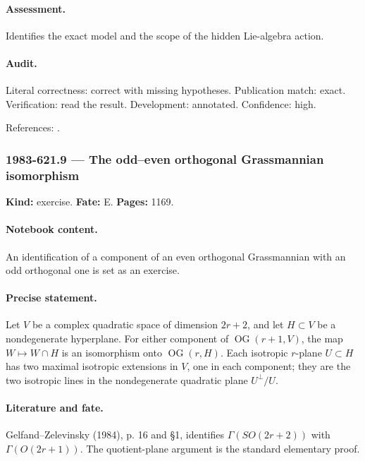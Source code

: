 \paragraph{Assessment.} Identifies the exact model and the scope of the hidden Lie-algebra action.

\paragraph{Audit.} Literal correctness: correct with missing hypotheses. Publication match: exact. Verification: read the result. Development: annotated. Confidence: high.

\noindent References: \citep{gelfandzelevinsky1984models}.\par

\subsubsection{1983-621.9 --- The odd–even orthogonal Grassmannian isomorphism}

\label{item:1983-621.9}

\noindent\textbf{Kind:} exercise. \textbf{Fate:} E. \textbf{Pages:} 1169.\par

\paragraph{Notebook content.} An identification of a component of an even orthogonal Grassmannian with an odd orthogonal one is set as an exercise.

\paragraph{Precise statement.} Let \(V\) be a complex quadratic space of dimension \(2r+2\), and let \(H\subset V\) be a nondegenerate hyperplane. For either component of \(\operatorname{OG}(r+1,V)\), the map \(W\mapsto W\cap H\) is an isomorphism onto \(\operatorname{OG}(r,H)\). Each isotropic \(r\)-plane \(U\subset H\) has two maximal isotropic extensions in \(V\), one in each component; they are the two isotropic lines in the nondegenerate quadratic plane \(U^\perp/U\).

\paragraph{Literature and fate.} Gelfand–Zelevinsky (1984), p. 16 and \S1, identifies \(\Gamma(SO(2r+2))\) with \(\Gamma(O(2r+1))\). The quotient-plane argument is the standard elementary proof.

